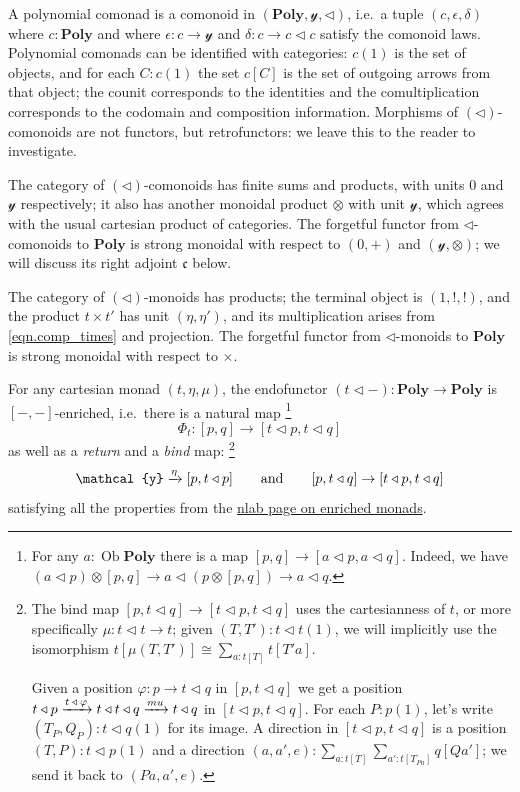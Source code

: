 \documentclass[11pt, one side, article]{memoir}
\theoremstyle{definition}
\theoremstyle{plain}
\DeclareMathOperator{\ob}{Ob}
\newcommand{\Cat}[1]{\mathbf{#1}}%
\newcommand{\To}[2][]{\xrightarrow[#1]{\tn{$#2$}}}
\newcommand{\tn}[1]{\textnormal{#1}}
\newcommand{\yon}{{\mathcal{y}}}
\newcommand{\poly}{\Cat{Poly}}
\newcommand{\0}{\textsf{0}}
\newcommand{\1}{\tn{\textsf{1}}}
\newcommand{\tri}{\mathbin{\triangleleft}}
\newcommand{\cofree}{\mathfrak{c}}
\newcommand{\hh}[2][]{#1 \tn{#2} #1}
\newcommand{\qqand}{\hh[\qquad]{and}}
\begin{document}
A polynomial comonad is a comonoid in $(\poly,\yon,\tri)$, i.e.\ a tuple $(c,\epsilon,\delta)$ where $c:\poly$ and where $\epsilon\colon c\to\yon$ and $\delta\colon c\to c\tri c$ satisfy the comonoid laws. Polynomial comonads can be identified with categories: $c(1)$ is the set of objects, and for each $C:c(1)$ the set $c[C]$ is the set of outgoing arrows from that object; the counit corresponds to the identities and the comultiplication corresponds to the codomain and composition information. Morphisms of $(\tri)$-comonoids are not functors, but retrofunctors: we leave this to the reader to investigate.

The category of $(\tri)$-comonoids has finite sums and products, with units $0$ and $\yon$ respectively; it also has another monoidal product $\otimes$ with unit $\yon$, which agrees with the usual cartesian product of categories. The forgetful functor from $\tri$-comonoids to $\poly$ is strong monoidal with respect to $(0,+)$ and $(\yon,\otimes)$; we will discuss its right adjoint $\cofree$ below.

The category of $(\tri)$-monoids has products; the terminal object is $(1,!,!)$, and the product $t\times t'$ has unit $(\eta,\eta')$, and its multiplication arises from \eqref{eqn.comp_times} and projection. The forgetful functor from $\tri$-monoids to $\poly$ is strong monoidal with respect to $\times$. 

For any cartesian monad $(t,\eta,\mu)$, the endofunctor $(t\tri-):\poly\to\poly$ is $[-,-]$-enriched, i.e.\ there is a natural map%
\footnote{For any $a:\ob\poly$ there is a map $[p,q]\to[a\tri p,a\tri q]$. Indeed, we have $(a\tri p)\otimes[p,q]\to a\tri(p\otimes[p,q])\to a\tri q$.}
\begin{equation}
	\Phi_t\colon[p,q]\to[t\tri p,t\tri q]
\end{equation}
as well as a \emph{return} and a \emph{bind} map:%
\footnote{The bind map $[p,t\tri q]\to[t\tri p,t\tri q]$ uses the cartesianness of $t$, or more specifically $\mu\colon t\tri t\to t$; given $(T,T'):t\tri t(1)$, we will implicitly use the isomorphism $t[\mu(T,T')]\cong\sum_{a:t[T]}t[T'a]$. 

Given a position $\varphi\colon p\to t\tri q$ in $[p,t\tri q]$ we get a position $t\tri p\To{t\tri\varphi}t\tri t\tri q\To{mu}t\tri q$ in $[t\tri p,t\tri q]$. For each $P:p(1)$, let's write $(T_P,Q_P):t\tri q(1)$ for its image. A direction in $[t\tri p,t\tri q]$ is a position $(T,P):t\tri p(1)$ and a direction $(a,a',e):\sum_{a:t[T]}\sum_{a':t[T_{Pa}]}q[Qa']$; we send it back to $(Pa, a', e)$.}
\begin{equation}
	\yon\To{\eta}[p,t\tri p]
	\qqand
	[p,t\tri q]\to[t\tri p,t\tri q]
\end{equation}
satisfying all the properties from the \href{https://ncatlab.org/nlab/show/enriched+monad}{nlab page on enriched monads}.
\end{document}
